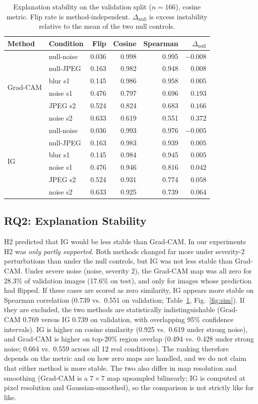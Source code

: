\documentclass[conference]{IEEEtran}
\begin{document}
\begin{table}[t]
\caption{Explanation stability on the validation split ($n{=}166$), cosine
metric. Flip rate is method-independent. $\Delta_{\text{null}}$ is excess
instability relative to the mean of the two null controls.}
\label{tab:stability}
\centering
\small
\setlength{\tabcolsep}{3.4pt}
\begin{tabular}{llrrrr}
\toprule
Method & Condition & Flip & Cosine & Spearman & $\Delta_{\text{null}}$ \\
\midrule
\multirow{6}{*}{Grad-CAM}
 & null-noise & 0.036 & 0.998 & 0.995 & $-0.008$ \\
 & null-JPEG  & 0.163 & 0.982 & 0.948 & $0.008$ \\
 & blur s1    & 0.145 & 0.986 & 0.958 & $0.005$ \\
 & noise s1   & 0.476 & 0.797 & 0.696 & $0.193$ \\
 & JPEG s2    & 0.524 & 0.824 & 0.683 & $0.166$ \\
 & noise s2   & 0.633 & 0.619 & 0.551 & $0.372$ \\
\midrule
\multirow{6}{*}{IG}
 & null-noise & 0.036 & 0.993 & 0.976 & $-0.005$ \\
 & null-JPEG  & 0.163 & 0.983 & 0.939 & $0.005$ \\
 & blur s1    & 0.145 & 0.984 & 0.945 & $0.005$ \\
 & noise s1   & 0.476 & 0.946 & 0.816 & $0.042$ \\
 & JPEG s2    & 0.524 & 0.931 & 0.774 & $0.058$ \\
 & noise s2   & 0.633 & 0.925 & 0.739 & $0.064$ \\
\bottomrule
\end{tabular}
\end{table}

\subsection{RQ2: Explanation Stability}
H2 predicted that IG would be less stable than Grad-CAM. In our experiments
H2 was \emph{only partly supported}. Both methods changed far more under
severity-2 perturbations than under the null controls, but IG was not less
stable than Grad-CAM. Under severe noise (noise, severity 2), the Grad-CAM
map was all zero for 28.3\% of validation images (17.6\% on test), and only
for images whose prediction had flipped. If these cases are scored as zero
similarity, IG appears more stable on Spearman correlation
(0.739 vs.\ 0.551 on validation; Table~\ref{tab:stability},
Fig.~\ref{fig:sim}). If they are excluded, the two methods are statistically
indistinguishable (Grad-CAM 0.769 versus IG 0.739 on validation, with
overlapping 95\% confidence intervals). IG is higher on cosine similarity
(0.925 vs.\ 0.619 under strong noise), and Grad-CAM is higher on top-20\%
region overlap (0.494 vs.\ 0.428 under strong noise; 0.664 vs.\ 0.559
across all 12 real conditions). The ranking therefore depends on the metric
and on how zero maps are handled, and we do not claim that either method is
more stable. The two also differ in map resolution and smoothing
(Grad-CAM is a $7\times7$ map upsampled bilinearly; IG is computed at pixel
resolution and Gaussian-smoothed), so the comparison is not strictly like for like.
\end{document}
